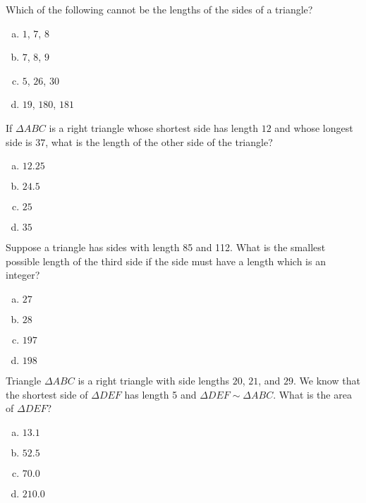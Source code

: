 \documentclass[12pt,letterpaper]{exam}
\begin{document}
\vspace{3cm}
\vfill

\newpage


\begin{questions}

\question Which of the following cannot be the lengths of the sides of a triangle?
	\begin{enumerate}[(a)]
	\item $1$, $7$, $8$
	\item $7$, $8$, $9$
	\item $5$, $26$, $30$
	\item $19$, $180$, $181$
	\end{enumerate} \vfill



\question If $\Delta ABC$ is a right triangle whose shortest side has length $12$ and whose longest side is $37$, what is the length of the other side of the triangle? 
	\begin{enumerate}[(a)]
	\item $12.25$
	\item $24.5$
	\item $25$
	\item $35$
	\end{enumerate} \vfill



\question Suppose a triangle has sides with length 85 and 112. What is the smallest possible length of the third side if the side must have a length which is an integer? 
	\begin{enumerate}[(a)]
	\item $27$
	\item $28$
	\item $197$
	\item $198$
	\end{enumerate} \vfill



\question Triangle $\Delta ABC$ is a right triangle with side lengths $20$, $21$, and $29$. We know that the shortest side of $\Delta DEF$ has length 5 and $\Delta DEF \sim \Delta ABC$. What is the area of $\Delta DEF$?
	\begin{enumerate}[(a)]
	\item $13.1$
	\item $52.5$
	\item $70.0$
	\item $210.0$
	\end{enumerate} \vfill




\end{questions}
\end{document}
